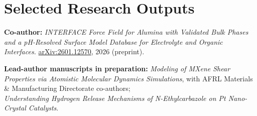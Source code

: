 \documentclass[letterpaper,10pt]{article}
\newcommand{\keepsection}{\needspace{6\baselineskip}}
\begin{document}
\keepsection\section*{Selected Research Outputs}
\textbf{Co-author:} \textit{INTERFACE Force Field for Alumina with Validated Bulk Phases and a pH-Resolved Surface Model Database for Electrolyte and Organic Interfaces.} \href{https://arxiv.org/abs/2601.12570}{arXiv:2601.12570}, 2026 (preprint).

\textbf{Lead-author manuscripts in preparation:} \textit{Modeling of MXene Shear Properties via Atomistic Molecular Dynamics Simulations}, with AFRL Materials \& Manufacturing Directorate co-authors;\\ \textit{Understanding Hydrogen Release Mechanisms of N-Ethylcarbazole on Pt Nano-Crystal Catalysts}.
\end{document}
